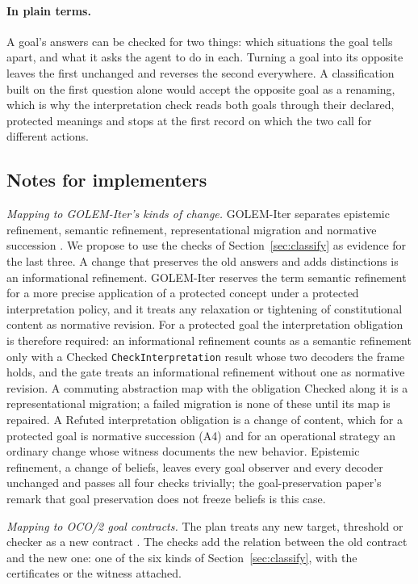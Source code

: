 \documentclass[11pt]{article}
\newcommand{\code}[1]{\texttt{#1}}
\newcommand{\plain}{\paragraph{In plain terms.}}
\theoremstyle{definition}
\theoremstyle{plain}
\begin{document}
\plain A goal's answers can be checked for two things: which situations the goal tells apart, and
what it asks the agent to do in each. Turning a goal into its opposite leaves the first unchanged
and reverses the second everywhere. A classification built on the first question alone would
accept the opposite goal as a renaming, which is why the interpretation check reads both goals
through their declared, protected meanings and stops at the first record on which the two call for
different actions.

\subsection{Notes for implementers}

\emph{Mapping to GOLEM-Iter's kinds of change.} GOLEM-Iter separates epistemic refinement, semantic
refinement, representational migration and normative succession \cite{golemspec}. We propose to
use the checks of Section~\ref{sec:classify} as evidence for the last three. A change that
preserves the old answers and adds distinctions is an informational refinement. GOLEM-Iter
reserves the term semantic refinement for a more precise application of a protected concept under
a protected interpretation policy, and it treats any relaxation or tightening of constitutional
content as normative revision. For a protected goal the interpretation obligation is therefore
required: an informational refinement counts as a semantic refinement only with a Checked
\code{CheckInterpretation} result whose two decoders the frame holds, and the gate treats an
informational refinement without one as normative revision. A commuting abstraction map with the
obligation Checked along it is a representational migration; a failed migration is none of these
until its map is repaired. A Refuted interpretation obligation is
a change of content, which for a protected goal is normative succession (A4) and for an operational
strategy an ordinary change whose witness documents the new behavior. Epistemic refinement, a
change of beliefs, leaves every goal observer and every decoder unchanged and passes all four
checks trivially; the goal-preservation paper's remark that goal preservation does not freeze
beliefs is this case.

\emph{Mapping to OCO/2 goal contracts.} The plan treats any new target, threshold or checker as a
new contract \cite{oco2}. The checks add the relation between the old contract and the new one:
one of the six kinds of Section~\ref{sec:classify}, with the certificates or the witness
attached.
\end{document}
